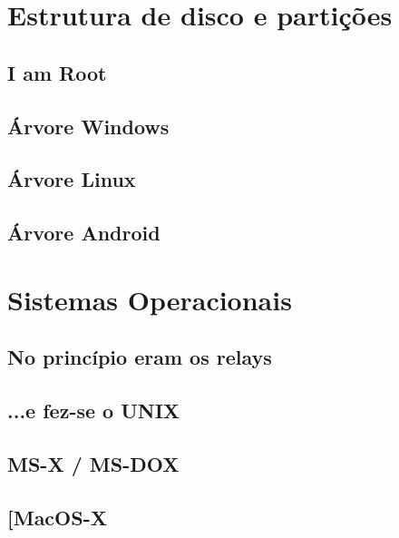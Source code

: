 \section[Estrutura de disco e partições]{Estrutura de disco e partições}


\subsection[I am Root]{I am Root}


\subsection[Árvore Windows]{Árvore Windows}


\subsection[Árvore Linux]{Árvore Linux}


\subsection[Árvore Android]{Árvore Android}


\section[Sistemas Operacionais]{Sistemas Operacionais}


\subsection[No princípio eram os relays]{No princípio eram os relays}


\subsection[...e fez-se o UNIX]{...e fez-se o UNIX}


\subsection[MS-X / MS-DOX]{MS-X / MS-DOX}


\subsection[MacOS-X]{[MacOS-X}


